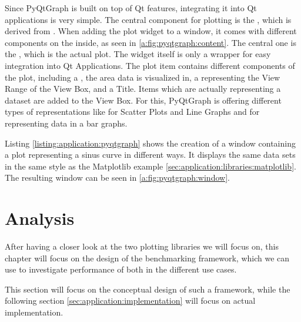 Since PyQtGraph is built on top of Qt features, integrating it into Qt
applications is very simple. The central component for plotting is the
, which is derived from
. When adding the plot widget to a
window, it comes with different components on the inside, as seen in
\ref{a:fig:pyqtgraph:content}. The central one is the
, which is the actual plot. The widget
itself is only a wrapper for easy integration into Qt Applications. The plot
item contains different components of the plot, including a
, the area data is visualized in,
a  representing the View Range
of the View Box, and a Title. Items which are actually representing a dataset are
added to the View Box. For this, PyQtGraph is offering different types of
representations like  for Scatter
Plots and Line Graphs and  for
representing data in a bar graphs.

Listing \ref{listing:application:pyqtgraph} shows the creation of a window
containing a plot representing a sinus curve in different ways. It displays the
same data sets in the same style as the Matplotlib example
\ref{sec:application:libraries:matplotlib}. The resulting window can be seen in
\ref{a:fig:pyqtgraph:window}.
\cite{PyQtGraphDoc}





\section{Analysis}
\label{sec:application:analysis}

After having a closer look at the two plotting libraries we will focus on, this
chapter will focus on the design of the benchmarking framework, which we can use
to investigate performance of both in the different use cases.

This section will focus on the conceptual design of such a framework, while the
following section \ref{sec:application:implementation} will focus on actual
implementation.

